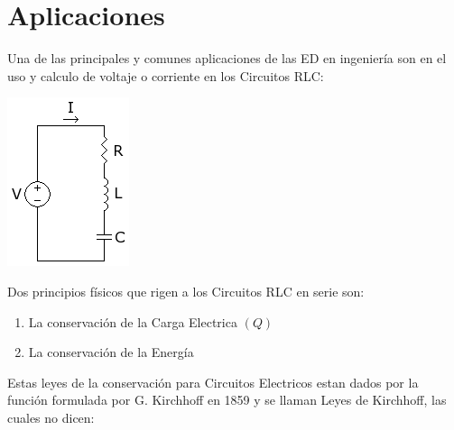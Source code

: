 \chapter{Aplicaciones}

Una de las principales y comunes aplicaciones de las ED en ingeniería son en el uso y calculo de voltaje o corriente en los Circuitos RLC:

\begin{center}
  \includegraphics[scale=0.5]{imgsAux/rlc.png}
\end{center}

Dos principios físicos que rigen a los Circuitos RLC en serie son:

\begin{enumerate}
  \item La conservación de la Carga Electrica \(\displaystyle(Q)\)
  \item La conservación de la Energía
\end{enumerate}

Estas leyes de la conservación para Circuitos Electricos estan dados por la función formulada por G. Kirchhoff en 1859 y se llaman Leyes de Kirchhoff, las cuales no dicen:

